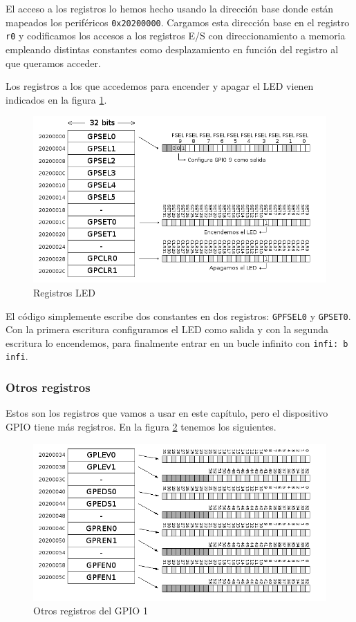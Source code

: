 El acceso a los registros lo hemos hecho usando la dirección base donde
están mapeados los periféricos {\tt 0x20200000}. Cargamos esta dirección
base en el registro {\tt r0} y codificamos los accesos a los registros
E/S con direccionamiento a memoria empleando distintas constantes como
desplazamiento en función del registro al que queramos acceder.

Los registros a los que accedemos para encender y apagar el LED vienen indicados
en la figura \ref{fig:gpio1}.

\begin{figure}[h]
  \centering
    \includegraphics[width=14cm]{graphs/gpio1.png}
  \caption{Registros LED}
  \label{fig:gpio1}
\end{figure}

El código simplemente escribe dos constantes en dos registros: {\tt GPFSEL0} y {\tt GPSET0}.
Con la primera escritura configuramos el LED como salida y con la segunda escritura lo
encendemos, para finalmente entrar en un bucle infinito con {\tt infi: b infi}.

\subsubsection{Otros registros}

Estos son los registros que vamos a usar en este capítulo, pero el dispositivo GPIO tiene
más registros. En la figura \ref{fig:gpio2} tenemos los siguientes.

\begin{figure}[h]
  \centering
    \includegraphics[width=14cm]{graphs/gpio2.png}
  \caption{Otros registros del GPIO 1}
  \label{fig:gpio2}
\end{figure}

